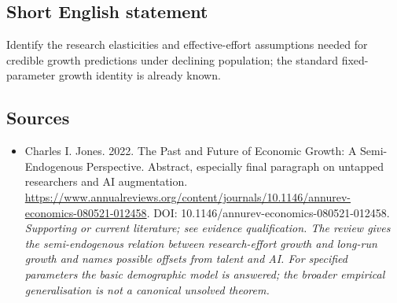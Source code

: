 \documentclass[11pt]{article}
\begin{document}
\subsection{Short English statement}
Identify the research elasticities and effective-effort assumptions needed for credible growth predictions under declining population; the standard fixed-parameter growth identity is already known.

\subsection{Sources}
\begin{itemize}\raggedright
\item[\textnormal{[S1]}]\hypertarget{source:30007550:1}{} Charles I. Jones. 2022. The Past and Future of Economic Growth: A Semi-Endogenous Perspective. Abstract, especially final paragraph on untapped researchers and AI augmentation.
\url{https://www.annualreviews.org/content/journals/10.1146/annurev-economics-080521-012458}.
DOI: 10.1146/annurev-economics-080521-012458.
{\small\textit{Supporting or current literature; see evidence qualification. The review gives the semi-endogenous relation between research-effort growth and long-run growth and names possible offsets from talent and AI. For specified parameters the basic demographic model is answered; the broader empirical generalisation is not a canonical unsolved theorem.}}
\end{itemize}
\end{document}
